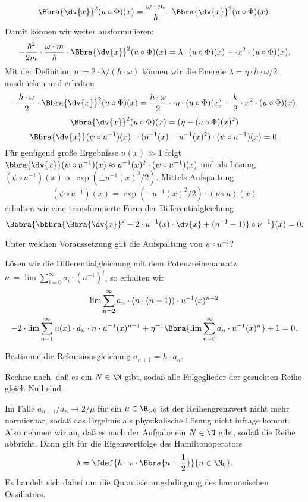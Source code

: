 \documentclass{subfiles}
\begin{document}
    \[
        \Bbra{\dv{x}}^2(u\circ\Phi)(x) = \frac{\omega\cdot m}{\hbar}\cdot\Bbra{\dv{x}}^2(u\circ\Phi)(x).
    \]
    Damit können wir weiter ausformulieren:
    \[
        -\frac{\hbar^2}{2m}\cdot\frac{\omega\cdot m}{\hbar}\cdot\Bbra{\dv{x}}^2(u\circ\Phi)(x) = \lambda\cdot (u\circ\Phi)(x) - \cdot x^2\cdot(u\circ\Phi)(x).
    \]
    Mit der Definition $\eta := 2\cdot\lambda / (\hbar\cdot\omega)$ können wir die Energie $\lambda = \eta\cdot\hbar\cdot\omega/2$ ausdrücken und erhalten 
    \[
        -\frac{\hbar\cdot\omega}{2}\cdot\Bbra{\dv{x}}^2(u\circ\Phi)(x) = \frac{\hbar\cdot\omega}{2}\cdot\cdot\eta\cdot(u\circ\Phi)(x) - \frac{k}{2}\cdot x^2\cdot (u\circ\Phi)(x).
    \]
    \vspace{1cm}
    \[
        \Bbra{\dv{x}}^2(u\circ\Phi)(x) = (\eta - (u\circ\Phi)(x)^2)
    \]
    \[\Bbra{\dv{x}}(\psi\circ u^{-1})(x) + (\eta^{-1}(x) - u^{-1}(x)^2)\cdot(\psi\circ u^{-1})(x) = 0.\]
    Für genügend große Ergebnisse $u(x)\gg 1$ folgt $\bbra{\dv{x}}(\psi\circ u^{-1})(x)\approx u^{-1}(x)^2\cdot(\psi\circ u^{-1})(x)$ und als Lösung $(\psi\circ u^{-1})(x) \propto \exp(\pm u^{-1}(x)^2/2)$. Mittels Aufspaltung
    \[(\psi\circ u^{-1})(x) = \exp(-u^{-1}(x)^2/2)\cdot(\nu\circ u)(x)\]
    erhalten wir eine transformierte Form der Differentialgleichung
    \[\Bbbra{\bbbra{\Bbra{\dv{x}}^2-2\cdot u^{-1}(x)\cdot\dv{x} + (\eta^{-1}-1)}\circ\nu^{-1}}(x) = 0.\]
    \begin{Aufgabe}
        \nr{} Unter welchen Voraussetzung gilt die Aufspaltung von $\psi\circ u^{-1}$?
    \end{Aufgabe}
    Lösen wir die Differentialgleichung mit dem Potenzreihenansatz $\nu := \lim\sum_{i=0}^\infty a_i\cdot (u^{-1})^i$, so erhalten wir
    \begin{multline*}
        \lim\sum_{n=2}^\infty a_{n}\cdot (n\cdot (n-1))\cdot u^{-1}(x)^{n-2} \\
        - 2\cdot \lim\sum_{n=1}^\infty u(x)\cdot a_n\cdot n\cdot u^{-1}(x)^{n-1} + \eta^{-1}\Bbra{\lim\sum_{n=0}^\infty a_n\cdot u^{-1}(x)^n} + 1 = 0.
    \end{multline*}
    \begin{Aufgabe}
        \nr{} Bestimme die Rekursionsgleichung $a_{n+1} = h\cdot a_n$.

        \nr{} Rechne nach, daß es ein $N\in\N$ gibt, sodaß alle Folgeglieder der gesuchten Reihe gleich Null sind. 
    \end{Aufgabe}
    Im Falle $a_{n+1}/a_n\to 2/\mu$ für ein $\mu\in\R_{>0}$ ist der Reihengrenzwert nicht mehr normierbar, sodaß das Ergebnis als physikalische Lösung nicht infrage kommt. Also nehmen wir an, daß es nach der Aufgabe ein $N\in\N$ gibt, sodaß die Reihe abbricht. Dann gilt für die Eigenwertfolge des Hamiltonoperators 
    \[\lambda = \fdef{\hbar\cdot\omega\cdot\Bbra{n+\frac{1}{2}}}{n\in\N_0}.\]
    Es handelt sich dabei um die Quantisierungsbdingung des harmonischen Oszillators. 
\end{document}
